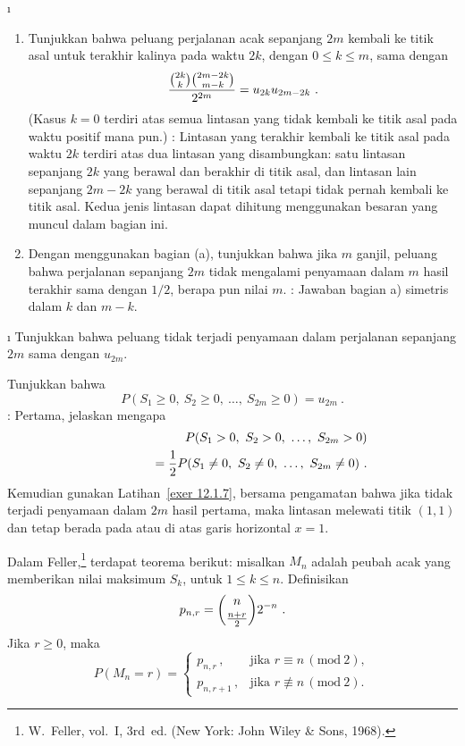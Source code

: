 \begin{LJSItem}
\i\label{exer 12.1.6} 
\begin{enumerate}
\item 
Tunjukkan bahwa peluang perjalanan acak sepanjang $2m$ kembali ke titik asal
untuk terakhir kalinya pada waktu $2k$, dengan $0 \le k \le m$, sama dengan
$$
{{{2k}\choose k}{{2m-2k}\choose {m-k}}\over{2^{2m}}} = u_{2k}u_{2m - 2k}\ .
$$  
(Kasus $k = 0$ terdiri atas semua lintasan yang tidak kembali ke titik asal pada
waktu positif mana pun.) : Lintasan yang terakhir kembali ke
titik asal pada waktu $2k$ terdiri atas dua lintasan yang disambungkan: satu
lintasan sepanjang $2k$ yang berawal dan berakhir di titik asal, dan lintasan
lain sepanjang $2m - 2k$ yang berawal di titik asal tetapi tidak pernah kembali
ke titik asal. Kedua jenis lintasan dapat dihitung menggunakan besaran yang
muncul dalam bagian ini.  
\item
Dengan menggunakan bagian (a), tunjukkan bahwa jika $m$ ganjil, peluang bahwa
perjalanan sepanjang $2m$ tidak mengalami penyamaan dalam $m$ hasil terakhir
sama dengan $1/2$, berapa pun nilai $m$. : Jawaban bagian a)
simetris dalam $k$ dan $m-k$.
\end{enumerate}

\i\label{exer 12.1.7} Tunjukkan bahwa peluang tidak terjadi penyamaan dalam
perjalanan sepanjang $2m$ sama dengan $u_{2m}$.

\istar\label{exer 12.1.8} Tunjukkan bahwa
$$P(S_1 \ge 0,\ S_2 \ge 0,\ \ldots,\ S_{2m} \ge 0) = u_{2m}\ .$$
: Pertama, jelaskan mengapa
\begin{eqnarray*}
&&P(S_1 > 0,\ S_2 > 0,\ \ldots,\ S_{2m} > 0) \\
&& \;\;\;\;\;\;\;\;\;\;\;\;\; = {1\over 2}P(S_1 \ne 0,\ S_2 \ne 0,\ \ldots,\ S_{2m} \ne 0)  \ .
\end{eqnarray*}
Kemudian gunakan Latihan~\ref{exer 12.1.7}, bersama pengamatan bahwa jika tidak
terjadi penyamaan dalam $2m$ hasil pertama, maka lintasan melewati titik $(1,1)$
dan tetap berada pada atau di atas garis horizontal $x = 1$.

\istar\label{exer 12.1.9} Dalam Feller,\footnote{W.~Feller,  vol.~I, 3rd~ed. (New York: John Wiley \& Sons, 1968).}
terdapat teorema berikut: misalkan $M_n$ adalah peubah acak yang memberikan
nilai maksimum $S_k$, untuk $1 \le k \le n$. Definisikan
$$p_{n, r} = {n\choose {{n+r}\over{2}}}2^{-n}\ .$$
Jika $r \ge 0$, maka
$$P(M_n = r) = \left \{ \begin{array}{ll}
                    p_{n, r}\,,&\mbox{jika $r \equiv n\,    (\mbox{mod}\ 2)$}, \\   
                  p_{n, r+1}\,,&\mbox{jika $r \not\equiv n\,(\mbox{mod}\ 2)$}.
                      \end{array}
             \right.   
$$


\end{LJSItem}
